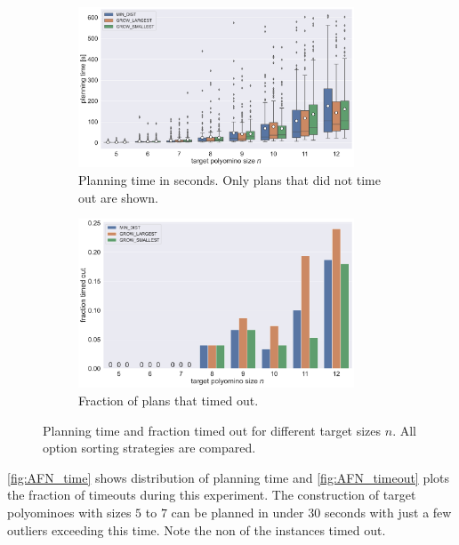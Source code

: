 \begin{figure}
	\centering
	\begin{subfigure}[b]{\textwidth}
		\centering
		\includegraphics[width=0.9\textwidth]{figures/plots/AFN_time.pdf}
		\caption{Planning time in seconds. Only plans that did not time out are shown.}
		\label{fig:AFN_time}
	\end{subfigure}

	\begin{subfigure}[b]{\textwidth}
		\centering
		\includegraphics[width=0.9\textwidth]{figures/plots/AFN_timeout.pdf}
		\caption{Fraction of plans that timed out.}
		\label{fig:AFN_timeout}
	\end{subfigure}
	\caption[Planning time and fraction timed out for different target sizes]{Planning time and fraction timed out for different target sizes $n$. All option sorting strategies are compared.}
	\label{fig:AFN_timestats}
\end{figure}

\autoref{fig:AFN_time} shows distribution of planning time and \autoref{fig:AFN_timeout} plots the fraction of timeouts during this experiment.
The construction of target polyominoes with sizes $5$ to $7$ can be planned in under $30$ seconds with just a few outliers exceeding this time.
Note the non of the instances timed out.

